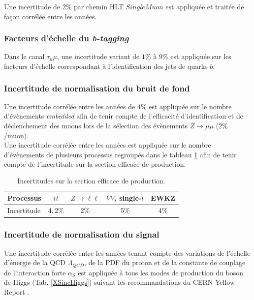 Une incertitude de $2\%$ par chemin HLT $SingleMuon$ est appliquée et traitée de façon corrélée entre les années.

\subsubsection{ Facteurs d'échelle du \textit{b-tagging}}

Dans le canal $\tau_h\mu$, une incertitude variant de $1\%$ à $9\%$ est appliquée sur les facteurs d'échelle correspondant à l'identification des jets de quarks $b$.  

\subsubsection{ Incertitude de normalisation du bruit de fond}

Une incertitude corrélée entre les années de $4\%$ est appliquée sur le nombre d'évènements \textit{embedded} afin de tenir compte de l'efficacité d'identification et de déclenchement des muons lors de la sélection des évènements $Z\to\mu\mu$ ($2\%$/muon). \\

Une incertitude corrélée entre les années est appliquée sur le nombre d'évènements de plusieurs processus regroupés dans le tableau \ref{XSinc} afin de tenir compte de l'incertitude sur la section efficace de production. \\  

\begin{table}[!ht]
\centering
\begin{tabular}{|l|c|c|c|c|}
\hline
Processus   & $t\overline{t}$ & $Z\to\ell\ell$ & $VV$, single-$t$ & EWKZ  \\ \hline
Incertitude & $4,2\%$         & $2\%$          & $5\%$            & $4\%$ \\ \hline
\end{tabular}
\caption{Incertitudes sur la section efficace de production.}
\label{XSinc}
\end{table}

\subsubsection{ Incertitude de normalisation du signal}

Une incertitude corrélée entre les années tenant compte des variations de l'échelle d'énergie de la QCD $\Lambda_{QCD}$, de la PDF du proton et de la constante de couplage de l'interaction forte $\alpha_S$ est appliquée à tous les modes de production du boson de Higgs (Tab. \ref{XSincHiggs}) suivant les recommandations du CERN Yellow Report \cite{LHCHiggsCrossSectionWorkingGroup:2016ypw}. \\


